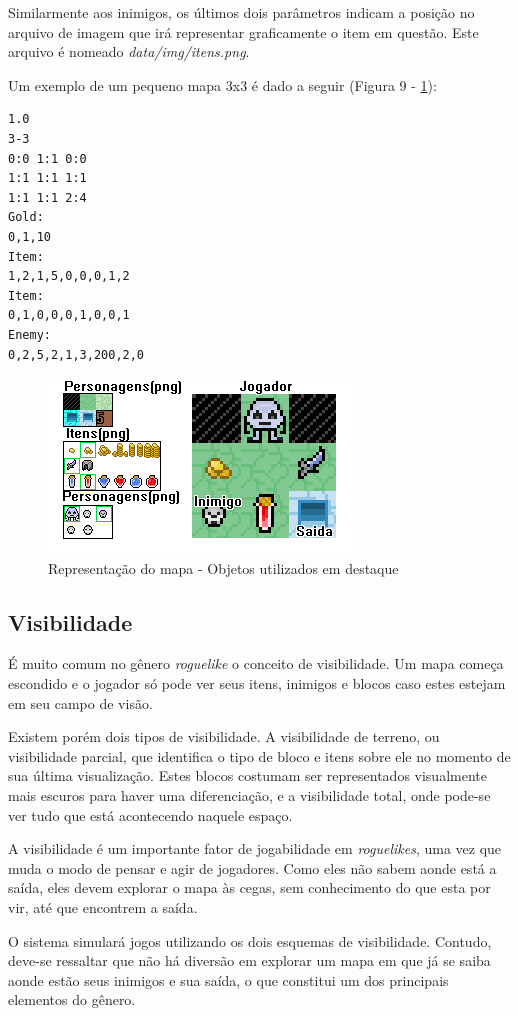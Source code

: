 Similarmente aos inimigos, os últimos dois parâmetros indicam a posição no arquivo de imagem que irá representar graficamente o item em questão. Este arquivo é nomeado \textit{data/img/itens.png}.

Um exemplo de um pequeno mapa 3x3 é dado a seguir (Figura 9 - \ref{fig09}):
\begin{verbatim}
1.0
3-3
0:0 1:1 0:0
1:1 1:1 1:1
1:1	1:1 2:4
Gold:
0,1,10
Item:
1,2,1,5,0,0,0,1,2
Item:
0,1,0,0,0,1,0,0,1
Enemy: 
0,2,5,2,1,3,200,2,0
\end{verbatim}
\begin{figure}[h]
	\centering
	\label{fig09}
		\includegraphics[keepaspectratio=true,scale=0.8]{figuras/fig09-map2.png}
	\caption{Representação do mapa - Objetos utilizados em destaque}
\end{figure}

\subsection{Visibilidade}

É muito comum no gênero \textit{roguelike} o conceito de visibilidade. Um mapa começa escondido e o jogador só pode ver seus itens, inimigos e blocos caso estes estejam em seu campo de visão. 

Existem porém dois tipos de visibilidade. A visibilidade de terreno, ou visibilidade parcial, que identifica o tipo de bloco e itens sobre ele no momento de sua última visualização. Estes blocos costumam ser representados visualmente mais escuros para haver uma diferenciação, e a visibilidade total, onde pode-se ver tudo que está acontecendo naquele espaço. 

A visibilidade é um importante fator de jogabilidade em \textit{roguelikes}, uma vez que muda o modo de pensar e agir de jogadores. Como eles não sabem aonde está a saída, eles devem explorar o mapa às cegas, sem conhecimento do que esta por vir, até que encontrem a saída. 

O sistema simulará jogos utilizando os dois esquemas de visibilidade. Contudo, deve-se ressaltar que não há diversão em explorar um mapa em que já se saiba aonde estão seus inimigos e sua saída, o que constitui um dos principais elementos do gênero.

